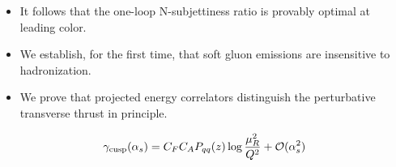 \begin{itemize}
  \item It follows that the one-loop N-subjettiness ratio is provably optimal at leading color.
  \item We establish, for the first time, that soft gluon emissions are insensitive to hadronization.
  \item We prove that projected energy correlators distinguish the perturbative transverse thrust in principle.
\end{itemize}

\begin{equation}
  \gamma_{\rm cusp}(\alpha_s) = C_F C_A P_{qq}(z) \log\frac{\mu_R^2}{Q^2} + \mathcal{O}(\alpha_s^{2})
  \label{eq:5}
\end{equation}

